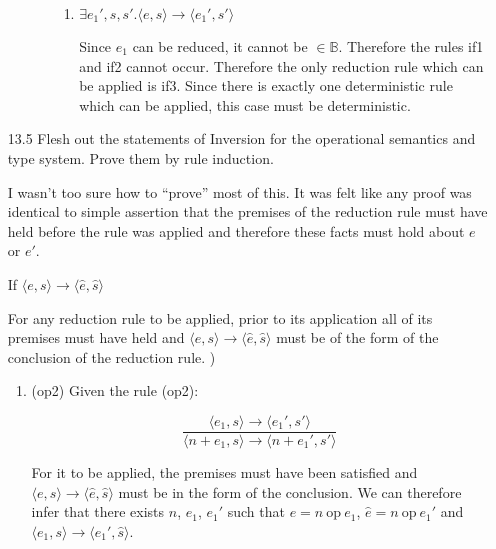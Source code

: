 \documentclass[10pt,\jkfside,a4paper]{article}
\begin{document}
\begin{enumerate}
\begin{enumerate}[label=\textbf{Case}]
\begin{enumerate}[label=\textbf{Case}]
\begin{enumerate}[label=\textbf{Case}]
\item $\exists e_1', s, s'. \langle e, s \rangle \to \langle
e_1', s' \rangle $

Since $e_1$ can be reduced, it cannot be $\in \mathbb{B}$. Therefore the
rules if1 and if2 cannot occur. Therefore the only reduction rule which can be
applied is if3. Since there is exactly one deterministic rule which can be
applied, this case must be deterministic.

\end{enumerate}

\end{enumerate}

\fi

\end{enumerate}

\item[13.5] Flesh out the statements of Inversion for the operational semantics
and type system. Prove them by rule induction.

I wasn't too sure how to ``prove'' most of this. It was felt like any proof
was identical to simple assertion that the premises of the reduction rule
must have held before the rule was applied and therefore these facts must
hold about $e$ or $e'$.

If $ \langle e, s \rangle \to \langle \hat{e}, \hat{s} \rangle $

For any reduction rule to be applied, prior to its application all of its
premises must have held and $ \langle e, s \rangle \to \langle \hat{e},
\hat{s} \rangle $ must be of the form of the conclusion of the reduction
rule. )


\setcounter{inversion}{2}

\begin{enumerate}[label=\arabic{inversion}.]


\item (op2) Given the rule (op2):

\[
\dfrac{
\langle e_1, s \rangle \to \langle e_1', s' \rangle
}{
\langle n + e_1, s \rangle \to \langle n + e_1', s' \rangle
}
\]

For it to be applied, the premises must have been satisfied and $\langle e,
s\rangle \to \langle \hat{e}, \hat{s}\rangle$ must be in the form of the
conclusion. We can therefore infer that there exists $n$, $e_1$, $e_1'$
such that $e = n \ \text{op} \ e_1$, $\hat{e} = n \ \text{op} \ e_1'$ and $
\langle e_1, s \rangle \to \langle e_1', \hat{s} \rangle $.


\end{enumerate}
\end{enumerate}
\end{document}
